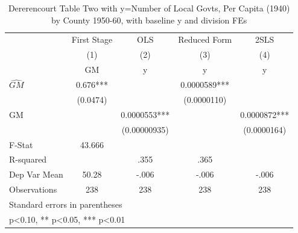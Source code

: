 \begin{table}[htbp]\centering
\def\sym#1{\ifmmode^{#1}\else\(^{#1}\)\fi}
\caption{Dererencourt Table Two with y=Number of Local Govts, Per Capita (1940) by County 1950-60, with baseline y and division FEs}
\begin{tabular}{l*{4}{c}}
\toprule
                    & First Stage   &         OLS   &Reduced Form   &        2SLS   \\
                    &\multicolumn{1}{c}{(1)}&\multicolumn{1}{c}{(2)}&\multicolumn{1}{c}{(3)}&\multicolumn{1}{c}{(4)}\\
                    &\multicolumn{1}{c}{GM}&\multicolumn{1}{c}{y}&\multicolumn{1}{c}{y}&\multicolumn{1}{c}{y}\\
\midrule
$\hat{GM}$          &       0.676***&               &   0.0000589***&               \\
                    &    (0.0474)   &               & (0.0000110)   &               \\
\addlinespace
GM                  &               &   0.0000553***&               &   0.0000872***\\
                    &               &(0.00000935)   &               & (0.0000164)   \\
\midrule
F-Stat              &      43.666   &               &               &               \\
R-squared           &               &        .355   &        .365   &               \\
Dep Var Mean        &       50.28   &       -.006   &       -.006   &       -.006   \\
Observations        &         238   &         238   &         238   &         238   \\
\bottomrule
\multicolumn{5}{l}{\footnotesize Standard errors in parentheses}\\
\multicolumn{5}{l}{\footnotesize * p<0.10, ** p<0.05, *** p<0.01}\\
\end{tabular}
\end{table}
